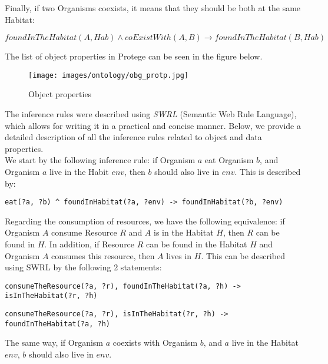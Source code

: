 Finally, if two Organisms coexists, it means that they should be both at the same Habitat:

$$foundInTheHabitat(A, Hab)
\land coExistWith(A, B) \rightarrow
foundInTheHabitat(B, Hab)$$

The list of object properties in Protege can be seen in the figure below.

\begin{figure}[H]
    \centering
    \texttt{[image: images/ontology/obg\_protp.jpg]}
    \caption{Object properties}
    \label{fig:obj}
\end{figure}

The inference rules were described using \textit{SWRL} (Semantic Web Rule Language), which allows for writing it in a practical and concise manner. Below, we provide a detailed description of all the inference rules related to object and data properties.
\\

We start by the following inference rule: if Organism $a$ eat Organism $b$, and Organism $a$ live in the Habit $env$, then $b$ should also live in $env$. This is described by:
\\

\begin{lstlisting}
eat(?a, ?b) ^ foundInHabitat(?a, ?env) -> foundInHabitat(?b, ?env)
\end{lstlisting}

Regarding the consumption of resources, we have the following equivalence: if Organism $A$ consume Resource $R$ and $A$ is in the Habitat $H$, then $R$ can be found in $H$. In addition, if Resource $R$ can be found in the Habitat $H$ and Organism $A$ consumes this resource, then $A$ lives in $H$. This can be described using SWRL by the following 2 statements:
\\

\begin{lstlisting}
consumeTheResource(?a, ?r), foundInTheHabitat(?a, ?h) -> isInTheHabitat(?r, ?h)
\end{lstlisting}

\begin{lstlisting}
consumeTheResource(?a, ?r), isInTheHabitat(?r, ?h) -> foundInTheHabitat(?a, ?h)
\end{lstlisting}


The same way, if Organism $a$ coexists with Organism $b$, and $a$ live in the Habitat $env$, $b$ should also live in $env$.
\\

